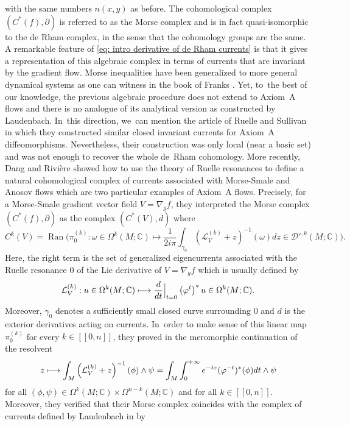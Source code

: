 \documentclass[JEP,XML,SOM,Unicode,NoEqCountersInSection,NoFloatCountersInSection,published]{cedram}
\newcommand\mto{\mathchoice{\longmapsto}{\mapsto}{\mapsto}{\mapsto}}
\newcommand{\lcr}{[\![}
\newcommand{\rcr}{]\!]}
\theoremstyle{definition}
\theoremstyle{plain}
\newcommand{\C}{\mathbb{C}}
\newcommand{\D}{\mathcal{D}}
\newcommand{\Lie}{\mathcal{L}}
\DeclareMathOperator{\Ran}{Ran}
\def\rest#1#2{\mathchoice
{\setbox1\hbox{${\displaystyle #1}_{\scriptstyle #2}$}
\restrictionaux{#1}{#2}}
{\setbox1\hbox{${\textstyle #1}_{\scriptstyle #2}$}
\restrictionaux{#1}{#2}}
{\setbox1\hbox{${\scriptstyle #1}_{\scriptscriptstyle #2}$}
\restrictionaux{#1}{#2}}
{\setbox1\hbox{${\scriptscriptstyle #1}_{\scriptscriptstyle #2}$}
\restrictionaux{#1}{#2}}}
\def\restrictionaux#1#2{{#1\,\smash{\vrule height.8\ht1 depth.85\dp1}}_{\,#2}}
\begin{document}
with the same numbers $n(x,y)$ as before. The cohomological complex $(C^*(f),\partial)$ is referred to as the Morse complex and is in fact quasi-isomorphic to the de Rham complex, in the sense that the cohomology groups are the same. A remarkable feature of \eqref{eq: intro derivative of de Rham currents} is that it gives a representation of this algebraic complex in terms of currents that are invariant by the gradient flow. Morse inequalities have been generalized to more general dynamical systems as one can witness in the book of Franks \cite{franks_homology}. Yet, to~the best of our knowledge, the previous algebraic procedure does not extend to Axiom~A flows and there is no analogue of its analytical version as constructed by Laudenbach. In~this direction, we~can mention the article of Ruelle and Sullivan~\cite{ruelle-sullivan} in which they constructed similar closed invariant currents for Axiom~A diffeomorphisms. Nevertheless, their construction was only local (near a basic set) and was not enough to recover the whole de~Rham cohomology. More recently, Dang and Rivière showed how to use the theory of Ruelle resonances \cite{DR0} to define a natural cohomological complex of currents associated with Morse-Smale and Anosov flows which are two particular examples of Axiom~A flows. Precisely, for a Morse-Smale gradient vector field $V = \nabla_g f$, they interpreted the Morse complex $(C^* (f),\partial)$ as the complex $(C^* (V),d)$ where
\begin{equation}\label{eq: intro def Morse complex}
C^k (V) = \Ran \biggl(\pi_0^{(k)}: \omega \!\in\! \Omega^{k} (M; \C) \mapsto \frac{1}{2 i \pi} \int_{\gamma_0}(\Lie_{V}^{(k)} + z)^{-1} (\omega) dz \in \D'^{,k} (M;\C) \biggr).
\end{equation}
Here, the right term is the set of generalized eigencurrents associated with the Ruelle resonance $0$ of the Lie derivative of $V = \nabla_g f$ which is usually defined by
\[
\Lie_V^{(k)}: u \in \Omega^k (M;\C) \mto \rest{\frac{d}{dt}}{t= 0} \left(\varphi^t \right)^* u \in \Omega^k (M;\C).
\]
Moreover, $\gamma_0$ denotes a sufficiently small closed curve surrounding $0$ and $d$ is the exterior derivatives acting on currents. In~order to make sense of this linear map $\pi_0^{(k)}$ for every $k\in\lcr0,n\rcr$, they proved in \cite[Prop.\,4.2]{DR0} the meromorphic continuation of the resolvent
\[
z \mto \int_M \left(\Lie_{V}^{(k)} + z \right)^{-1} (\phi) \wedge \psi = \int_M \int_0^{+\infty} e^{-tz} (\varphi^{-t})^*(\phi) dt \wedge \psi
\]
for all $(\phi, \psi) \in \Omega^k (M;\C) \times \Omega^{n-k} (M;\C)$ and for all $k\in\lcr0,n\rcr$. Moreover, they verified that their Morse complex coincides with the complex of currents defined by Laudenbach in \cite{laudenbach} by
\end{document}
